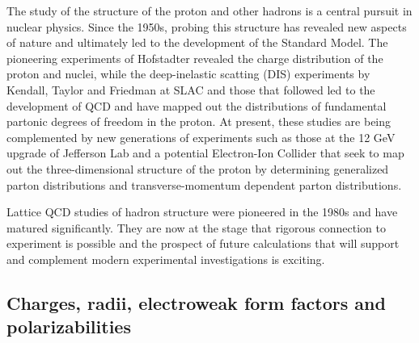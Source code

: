 
The study of the structure of the proton and other hadrons is a central pursuit in nuclear physics. Since the 1950s, probing this structure has revealed new aspects of nature and ultimately led to the development of the Standard Model. The pioneering experiments of Hofstadter revealed the charge distribution of the proton and nuclei, while the deep-inelastic scatting (DIS) experiments by Kendall, Taylor and Friedman at SLAC and those that followed led to the development of QCD and have mapped out  the distributions of fundamental partonic degrees of freedom in the proton. At present, these studies are being complemented by new generations of experiments such as those at the 12 GeV upgrade of Jefferson Lab and a potential Electron-Ion Collider that seek to map out the three-dimensional structure of the proton by determining generalized parton distributions and transverse-momentum dependent parton distributions. 

Lattice QCD studies of hadron structure were pioneered in the 1980s \cite{} and have matured significantly. They are now at the stage that rigorous connection to experiment is possible and the prospect of future calculations that will support and complement modern experimental investigations is exciting.


\subsection{Charges, radii,  electroweak form factors and polarizabilities}

%
%
%

